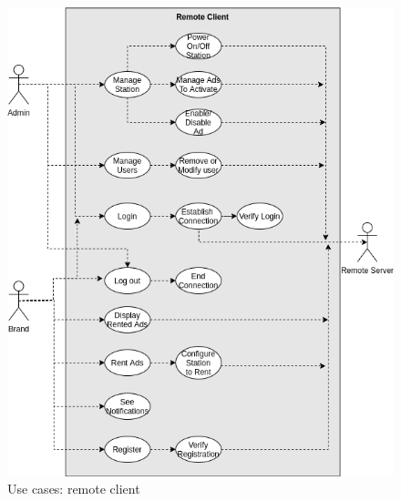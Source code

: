 \begin{figure}[htb!]
\centering
    \includegraphics[width=0.9\columnwidth]{./img/use-cases-rc.png}
  \caption{Use cases: remote client}%
\label{fig:use-cases-rc}
\end{figure}


